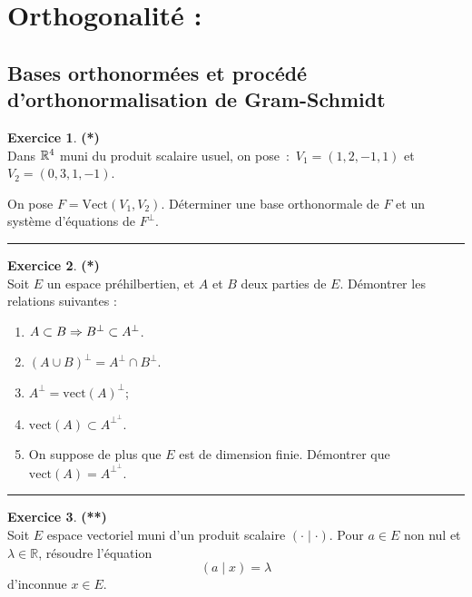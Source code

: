 \documentclass[a4paper,11pt]{article}
\theoremstyle{definition}
\newtheorem{exo}{Exercice} %
\begin{document}
\begin{minipage}{1\linewidth}\begin{minipage}[t]{0.48\linewidth}\raggedright
		\section*{Orthogonalité :}%
		\subsection*{Bases orthonormées et procédé d'orthonormalisation de Gram-Schmidt}

		
		\begin{exo}\textbf{(*)}\quad\\[0.2cm]
		Dans $\mathbb{R}^4$ muni du produit scalaire usuel, on pose~:~$V_1=(1,2,-1,1)$ et $V_2=(0,3,1,-1)$.
		
		On pose $F=\mbox{Vect}(V_1,V_2)$. Déterminer une base orthonormale de $F$ et un système d'équations de $F^\bot$.	
			
			
			\centering\rule{1\linewidth}{0.6pt}\end{exo}
		
		
		
		\begin{exo}\textbf{(*)}\quad\\[0.2cm]
			
			Soit $E$ un espace préhilbertien, et $A$ et $B$ deux parties de $E$. Démontrer les relations suivantes :
			\begin{enumerate}
				\item $A\subset B\Large\Rightarrow B^\perp\subset A^\perp$.
				\item $(A\cup B)^\perp=A^\perp\cap B^\perp$.
				\item $A^\perp=\textrm{vect}(A)^\perp$;
				\item $\textrm{vect}(A)\subset A^{\perp^\perp}$.
				\item On suppose de plus que $E$ est de dimension finie. Démontrer que 
				$\textrm{vect}(A)= A^{\perp^\perp}$.
			\end{enumerate}
			
			\centering\rule{1\linewidth}{0.6pt}\end{exo}
		
				
		\begin{exo}\textbf{(**)}\quad\\[0.2cm]
			Soit $E$ espace vectoriel muni d'un produit scalaire $(\cdot \mid \cdot)$. Pour $a \in E$ non nul et $\lambda \in \mathbb{R}$, résoudre l'équation
			$$(a \mid x)=\lambda $$
			d'inconnue $x \in E$.
			

\end{exo}
\end{minipage}
\end{minipage}
\end{document}
